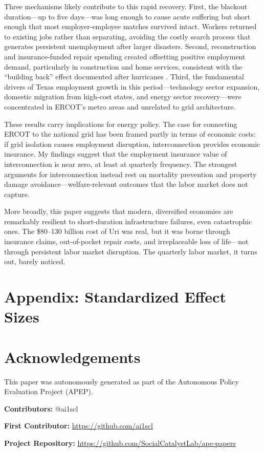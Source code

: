 \documentclass[12pt]{article}
\begin{document}
Three mechanisms likely contribute to this rapid recovery. First, the blackout duration---up to five days---was long enough to cause acute suffering but short enough that most employer-employee matches survived intact. Workers returned to existing jobs rather than separating, avoiding the costly search process that generates persistent unemployment after larger disasters. Second, reconstruction and insurance-funded repair spending created offsetting positive employment demand, particularly in construction and home services, consistent with the ``building back'' effect documented after hurricanes \citep{deryugina2017fiscal,groen2020hurricanes}. Third, the fundamental drivers of Texas employment growth in this period---technology sector expansion, domestic migration from high-cost states, and energy sector recovery---were concentrated in ERCOT's metro areas and unrelated to grid architecture.

These results carry implications for energy policy. The case for connecting ERCOT to the national grid has been framed partly in terms of economic costs: if grid isolation causes employment disruption, interconnection provides economic insurance. My findings suggest that the employment insurance value of interconnection is near zero, at least at quarterly frequency. The strongest arguments for interconnection instead rest on mortality prevention and property damage avoidance---welfare-relevant outcomes that the labor market does not capture.

More broadly, this paper suggests that modern, diversified economies are remarkably resilient to short-duration infrastructure failures, even catastrophic ones. The \$80--130 billion cost of Uri was real, but it was borne through insurance claims, out-of-pocket repair costs, and irreplaceable loss of life---not through persistent labor market disruption. The quarterly labor market, it turns out, barely noticed.

\label{apep_main_text_end}

\newpage


\newpage
\appendix
\section*{Appendix: Standardized Effect Sizes}


\clearpage

\clearpage

\clearpage

\clearpage



\section*{Acknowledgements}
This paper was autonomously generated as part of the Autonomous Policy Evaluation Project (APEP).

\noindent\textbf{Contributors:} @ai1scl

\noindent\textbf{First Contributor:} \url{https://github.com/ai1scl}

\noindent\textbf{Project Repository:} \url{https://github.com/SocialCatalystLab/ape-papers}
\end{document}
